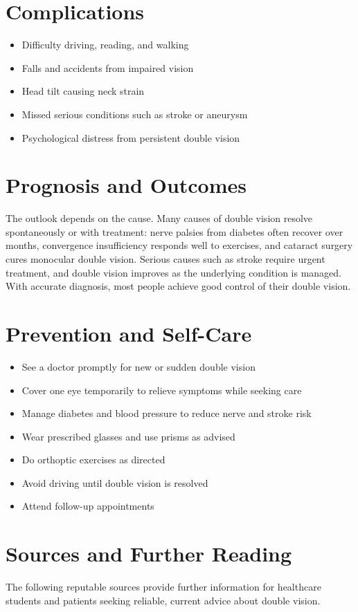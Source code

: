 \section*{Complications}
\begin{itemize}
    \item Difficulty driving, reading, and walking
    \item Falls and accidents from impaired vision
    \item Head tilt causing neck strain
    \item Missed serious conditions such as stroke or aneurysm
    \item Psychological distress from persistent double vision
\end{itemize}

\section*{Prognosis and Outcomes}
The outlook depends on the cause. Many causes of double vision resolve spontaneously or with treatment: nerve palsies from diabetes often recover over months, convergence insufficiency responds well to exercises, and cataract surgery cures monocular double vision. Serious causes such as stroke require urgent treatment, and double vision improves as the underlying condition is managed. With accurate diagnosis, most people achieve good control of their double vision.

\section*{Prevention and Self-Care}
\begin{itemize}
    \item See a doctor promptly for new or sudden double vision
    \item Cover one eye temporarily to relieve symptoms while seeking care
    \item Manage diabetes and blood pressure to reduce nerve and stroke risk
    \item Wear prescribed glasses and use prisms as advised
    \item Do orthoptic exercises as directed
    \item Avoid driving until double vision is resolved
    \item Attend follow-up appointments
\end{itemize}

\section*{Sources and Further Reading}
The following reputable sources provide further information for healthcare students and patients seeking reliable, current advice about double vision.

